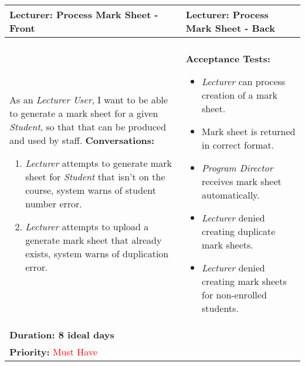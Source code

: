 \documentclass[11pt]{article}
\begin{document}
\begin{center}
\begin{tabular}{ | m{8cm}  |  m{8cm}  | } 
 \hline
 \textbf{Lecturer: Process Mark Sheet - Front} &  \textbf{Lecturer: Process Mark Sheet - Back}  \\ 
  \hline
&\\[5pt]
As an \emph{Lecturer User}, I want to be able to generate a mark sheet for a given \emph{Student}, so that that can be produced and used by staff.\newline
\textbf{Conversations:}
\begin{enumerate}
\item{\emph{Lecturer} attempts to generate mark sheet for \emph{Student} that isn't on the course, system warns of student number error.}
\item{\emph{Lecturer} attempts to upload a generate mark sheet that already exists, system warns of duplication error.}
\end{enumerate}
& \textbf{Acceptance Tests:} 
\begin{itemize}
\item{\emph{Lecturer} can process creation of a mark sheet. }
\item{Mark sheet is returned in correct format.}
\item{\emph{Program Director} receives mark sheet automatically.}
\item{\emph{Lecturer} denied creating duplicate mark sheets.} 
\item{\emph{Lecturer} denied creating mark sheets for non-enrolled students.}
\end{itemize} \\
\textbf{Duration: 8 ideal days} &\\
\textbf{Priority:}  \textcolor{red}{Must Have} & \\
 \hline
\end{tabular}
\end{center}
\end{document}
